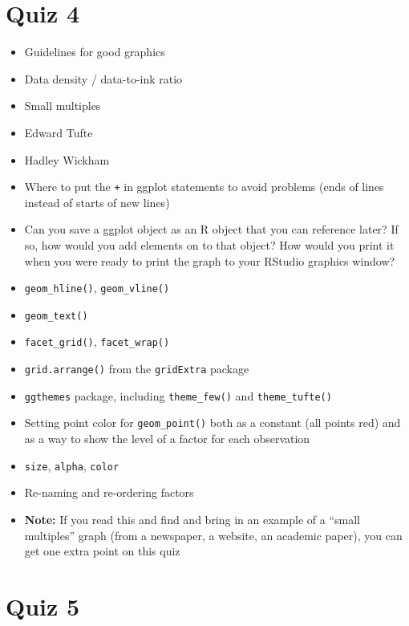\documentclass[]{book}
\providecommand{\tightlist}{%
  \setlength{\itemsep}{0pt}\setlength{\parskip}{0pt}}
\theoremstyle{definition}
\theoremstyle{definition}
\theoremstyle{definition}
\theoremstyle{remark}
\begin{document}
\section{Quiz 4}\label{quiz-4}

\begin{itemize}
\tightlist
\item
  Guidelines for good graphics
\item
  Data density / data-to-ink ratio
\item
  Small multiples
\item
  Edward Tufte
\item
  Hadley Wickham
\item
  Where to put the \texttt{+} in ggplot statements to avoid problems
  (ends of lines instead of starts of new lines)
\item
  Can you save a ggplot object as an R object that you can reference
  later? If so, how would you add elements on to that object? How would
  you print it when you were ready to print the graph to your RStudio
  graphics window?
\item
  \texttt{geom\_hline()}, \texttt{geom\_vline()}
\item
  \texttt{geom\_text()}
\item
  \texttt{facet\_grid()}, \texttt{facet\_wrap()}
\item
  \texttt{grid.arrange()} from the \texttt{gridExtra} package
\item
  \texttt{ggthemes} package, including \texttt{theme\_few()} and
  \texttt{theme\_tufte()}
\item
  Setting point color for \texttt{geom\_point()} both as a constant (all
  points red) and as a way to show the level of a factor for each
  observation
\item
  \texttt{size}, \texttt{alpha}, \texttt{color}
\item
  Re-naming and re-ordering factors
\item
  \textbf{Note:} If you read this and find and bring in an example of a
  ``small multiples'' graph (from a newspaper, a website, an academic
  paper), you can get one extra point on this quiz
\end{itemize}

\section{Quiz 5}\label{quiz-5}
\end{document}
